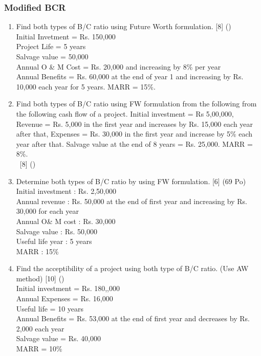 \documentclass[12pt]{article}
\newcommand{\enter}{\\\textcolor{white}{1}}
\begin{document}
		\subsubsection{Modified BCR}
			\begin{enumerate}
				\item Find both types of B/C ratio using Future Worth formulation. \hfill [8] ()\\
					Initial Invetment = Rs. 150,000\\
					Project Life = 5 years\\
					Salvage value = 50,000\\
					Annual O \& M Cost = Rs. 20,000 and increasing by 8\% per year\\
					Annual Benefits = Rs. 60,000 at the end of year 1 and increasing by Rs. 10,000 each year for 5 years. MARR = 15\%.

				\item Find both types of B/C ratio using FW formulation from the following from the following cash flow of a project. Initial investment = Rs 5,00,000, Revenue = Rs. 5,000 in the first year and increases by Rs. 15,000 each year after that, Expenses = Rs. 30,000 in the first year and increase by 5\% each year after that. Salvage value at the end of 8 years = Rs. 25,000. MARR = 8\%. 
				\enter\hfill [8] ()

				\item Determine both types of B/C ratio by using FW formulation. \hfill [6] (69 Po)\\
					Initial investment : Rs. 2,50,000\\
					Annual revenue     : Rs. 50,000 at the end of first year and increasing by Rs. 30,000 for each year\\
					Annual O\& M cost  : Rs. 30,000\\
					Salvage value      : Rs. 50,000\\
					Useful life year   : 5 years\\
					MARR               : 15\%

				\item Find the acceptibility of a project using both type of B/C ratio. (Use AW method) \hfill [10] ()\\
					Initial investment = Rs. 180,,000\\
					Annual Expenses = Rs. 16,000\\
					Useful life = 10 years\\
					Annual Benefits = Rs. 53,000 at the end of first year and decreases by Rs. 2,000 each year\\
					Salvage value = Rs. 40,000\\
					MARR = 10\%


\end{enumerate}
\end{document}
